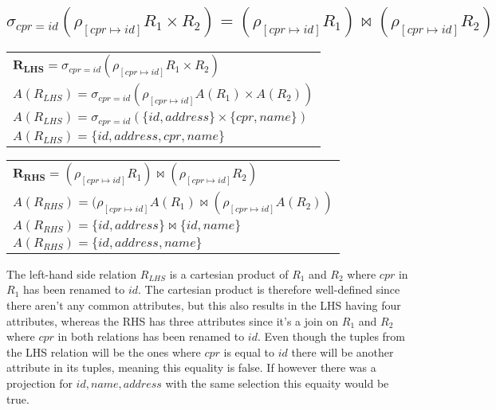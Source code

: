 \subsection{\normalsize{$\sigma_{cpr=id}(\rho_{[cpr \mapsto id]}R_1 \times R_2) = (\rho_{[cpr \mapsto id]}R_1) \Join (\rho_{[cpr \mapsto id]}R_2)$}}

\begin{table}[ht]
	\begin{tabular}{|l|}
		 $\bm{R_{LHS}} = \sigma_{cpr=id}(\rho_{[cpr \mapsto id]}R_1 \times R_2)$ \\[0.2cm]
		 $A(R_{LHS}) = \sigma_{cpr=id}(\rho_{[cpr \mapsto id]}A(R_1) \times A(R_2))$ \\[0.2cm]
		 $A(R_{LHS}) = \sigma_{cpr=id}(\{id, address\} \times \{cpr, name\})$ \\[0.2cm]
		 $A(R_{LHS}) = \{id, address, cpr, name\}$
	\end{tabular}
\end{table}

\begin{table}[ht]
	\begin{tabular}{|l|}
		 $\bm{R_{RHS}} = (\rho_{[cpr \mapsto id]}R_1) \Join (\rho_{[cpr \mapsto id]}R_2)$ \\[0.2cm]
		 $A(R_{RHS}) = (\rho_{[cpr \mapsto id]}A(R_1) \Join (\rho_{[cpr \mapsto id]}A(R_2))$ \\[0.2cm]
		 $A(R_{RHS}) = \{id, address\} \Join \{id, name\}$ \\[0.2cm]
		 $A(R_{RHS}) = \{id, address, name\}$
	\end{tabular}
\end{table}
\FloatBarrier

The left-hand side relation $R_{LHS}$ is a cartesian product of $R_1$ and $R_2$ where $cpr$ in $R_1$ has been renamed to $id$.
The cartesian product is therefore well-defined since there aren't any common attributes, but this also results in the LHS having four attributes, whereas the RHS has three attributes since it's a join on $R_1$ and $R_2$ where $cpr$ in both relations has been renamed to $id$. Even though the tuples from the LHS relation will be the ones where $cpr$ is equal to $id$ there will be another attribute in its tuples, meaning this equality is false.
If however there was a projection for $id, name, address$ with the same selection this equaity would be true.\\\\

